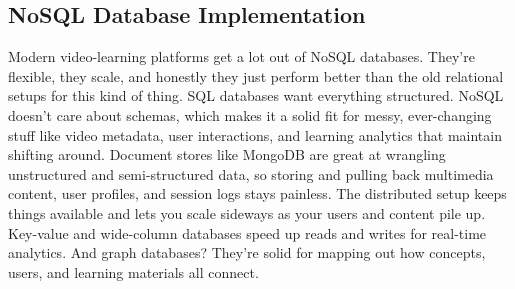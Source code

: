 \subsection{NoSQL Database Implementation}Modern video-learning platforms get a lot out of NoSQL databases. They're flexible, they scale, and honestly they just perform better than the old relational setups for this kind of thing. SQL databases want everything structured. NoSQL doesn't care about schemas, which makes it a solid fit for messy, ever-changing stuff like video metadata, user interactions, and learning analytics that maintain shifting around. Document stores like MongoDB are great at wrangling unstructured and semi-structured data, so storing and pulling back multimedia content, user profiles, and session logs stays painless. The distributed setup keeps things available and lets you scale sideways as your users and content pile up. Key-value and wide-column databases speed up reads and writes for real-time analytics. And graph databases? They're solid for mapping out how concepts, users, and learning materials all connect.

